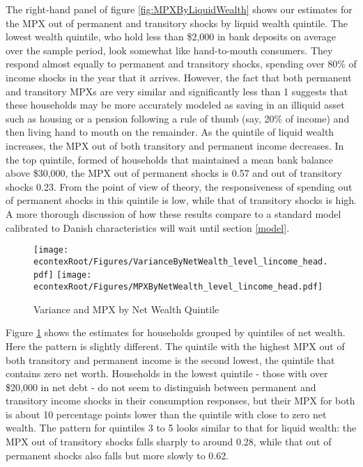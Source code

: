 \documentclass[titlepage]{\econtex}\newcommand{\texname}{ConsumptionHeterogeneity}
\begin{document}
The right-hand panel of figure \ref{fig:MPXByLiquidWealth} shows our estimates for the MPX out of permanent and transitory shocks by liquid wealth quintile. The lowest wealth quintile, who hold less than \$2,000 in bank deposits on average over the sample period, look somewhat like hand-to-mouth consumers. They respond almost equally to permanent and transitory shocks, spending over 80\% of income shocks in the year that it arrives. However, the fact that both permanent and transitory MPXs are very similar and significantly less than 1 suggests that these households may be more accurately modeled as saving in an illiquid asset such as housing or a pension following a rule of thumb (say, 20\% of income) and then living hand to mouth on the remainder. As the quintile of liquid wealth increases, the MPX out of both transitory and permanent income decreases. In the top quintile, formed of households that maintained a mean bank balance above \$30,000, the MPX out of permanent shocks is 0.57 and out of transitory shocks 0.23. From the point of view of theory, the responsiveness of spending out of permanent shocks in this quintile is low, while that of transitory shocks is high. A more thorough discussion of how these results compare to a standard model calibrated to Danish characteristics will wait until section \ref{model}.
\begin{figure}
	\centering
	\texttt{[image: \\econtexRoot/Figures/VarianceByNetWealth\_level\_lincome\_head.pdf]}
	\centering
	\texttt{[image: \\econtexRoot/Figures/MPXByNetWealth\_level\_lincome\_head.pdf]}
	\caption{Variance and MPX by Net Wealth Quintile}
	\label{fig:MPXByNetWealth}
\end{figure}

Figure \ref{fig:MPXByNetWealth} shows the estimates for households grouped by quintiles of net wealth. Here the pattern is slightly different. The quintile with the highest MPX out of both transitory and permanent income is the second lowest, the quintile that contains zero net worth. Households in the lowest quintile - those with over \$20,000 in net debt - do not seem to distinguish between permanent and transitory income shocks in their consumption responses, but their MPX for both is about 10 percentage points lower than the quintile with close to zero net wealth. The pattern for quintiles 3 to 5 looks similar to that for liquid wealth: the MPX out of transitory shocks falls sharply to around 0.28, while that out of permanent shocks also falls but more slowly to 0.62.
\end{document}
